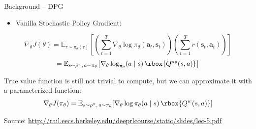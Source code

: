 \begin{frame}{Background -- DPG}
\begin{itemize}
    \item Vanilla Stochastic Policy Gradient:
\end{itemize}
\[
\nabla_\theta J(\theta) = \mathbb{E}_{\tau \sim \pi_\theta(\tau)}\!\left[ \left( \sum_{t=1}^{T} \nabla_\theta \log \pi_\theta(\mathbf{a}_t, \mathbf{s}_t) \right) \left( \sum_{t=1}^{T} r(\mathbf{s}_t, \mathbf{a}_t) \right) \right]
\]
\[
= \mathbb{E}_{s \sim \rho^\pi,\, a \sim \pi_\theta}\!\left[ \nabla_\theta \log_{\pi_\theta}(a \mid s)\, \rbox{Q^{\pi_\theta}(s, a)} \right]
\]

True value function is still not trivial to compute, but we can approximate it with a parameterized function:
\[
\nabla_\theta J(\pi_\theta) = \mathbb{E}_{s \sim \rho^\pi,\, a \sim \pi_\theta}\!\left[ \nabla_\theta \log \pi_\theta(a \mid s)\, \rbox{Q^{w}(s, a)} \right]
\]
\vfill
\begin{flushright}
    \tiny Source: \url{http://rail.eecs.berkeley.edu/deeprlcourse/static/slides/lec-5.pdf}
\end{flushright}
\end{frame}
